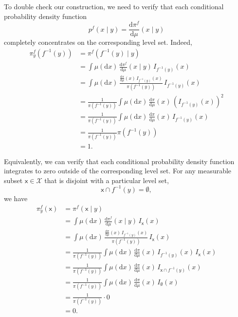 \documentclass[
  letterpaper,
  DIV=11,
  numbers=noendperiod]{scrartcl}
\begin{document}
To double check our construction, we need to verify that each
conditional probability density function \[
p^{f}(x \mid y) = \frac{ \mathrm{d}  \pi^{f} }{ \mathrm{d}  \mu  }( x \mid y )
\] completely concentrates on the corresponding level set. Indeed,
\begin{align*}
\pi^{f}_{y}( f^{-1}(y) )
&=
\pi^{f}( f^{-1}(y) \mid y)
\\
&=
\int \mu( \mathrm{d} x) \,
\frac{ \mathrm{d}  \pi^{f} }{ \mathrm{d}  \mu  }( x \mid y ) \,
I_{f^{-1}(y)}(x)
\\
&=
\int \mu( \mathrm{d} x) \,
\frac{ \frac{ \mathrm{d}  \pi }{ \mathrm{d}  \mu  }(x) \,
I_{f^{-1}(y)}(x) }{ \pi ( f^{-1}(y) ) }
\,
I_{f^{-1}(y)}(x)
\\
&=
\frac{1}{ \pi ( f^{-1}(y) ) }
\int \mu( \mathrm{d} x) \, \frac{ \mathrm{d}  \pi }{ \mathrm{d}  \mu  }(x) \,
\left( I_{f^{-1}(y)}(x) \right)^{2}
\\
&=
\frac{1}{ \pi ( f^{-1}(y) ) }
\int \mu( \mathrm{d} x) \, \frac{ \mathrm{d}  \pi }{ \mathrm{d}  \mu  }(x) \,
I_{f^{-1}(y)}(x)
\\
&=
\frac{1}{ \pi ( f^{-1}(y) ) }
\pi( f^{-1}(y) )
\\
&=
1.
\end{align*}

Equivalently, we can verify that each conditional probability density
function integrates to zero outside of the corresponding level set. For
any measurable subset \(\mathsf{x} \in \mathcal{X}\) that is disjoint
with a particular level set, \[
\mathsf{x} \cap f^{-1}(y) = \emptyset,
\] we have \begin{align*}
\pi^{f}_{y}( \mathsf{x} )
&=
\pi^{f}( \mathsf{x} \mid y)
\\
&=
\int \mu( \mathrm{d} x) \,
\frac{ \mathrm{d}  \pi^{f} }{ \mathrm{d}  \mu  }( x \mid y ) \,
I_{\mathsf{x}}(x)
\\
&=
\int \mu( \mathrm{d} x) \,
\frac{ \frac{ \mathrm{d}  \pi }{ \mathrm{d}  \mu  }(x) \,
I_{f^{-1}(y)}(x) }{ \pi ( f^{-1}(y) ) }
\,
I_{\mathsf{x}}(x)
\\
&=
\frac{1}{ \pi ( f^{-1}(y) ) }
\int \mu( \mathrm{d} x) \, \frac{ \mathrm{d}  \pi }{ \mathrm{d}  \mu  }(x) \,
I_{f^{-1}(y)}(x) \, I_{\mathsf{x}}(x)
\\
&=
\frac{1}{ \pi ( f^{-1}(y) ) }
\int \mu( \mathrm{d} x) \, \frac{ \mathrm{d}  \pi }{ \mathrm{d}  \mu  }(x) \,
I_{\mathsf{x} \cap f^{-1}(y) }(x)
\\
&=
\frac{1}{ \pi ( f^{-1}(y) ) }
\int \mu( \mathrm{d} x) \, \frac{ \mathrm{d}  \pi }{ \mathrm{d}  \mu  }(x) \,
I_{ \emptyset }(x)
\\
&=
\frac{1}{ \pi ( f^{-1}(y) ) } \cdot 0
\\
&=
0.
\end{align*}
\end{document}
